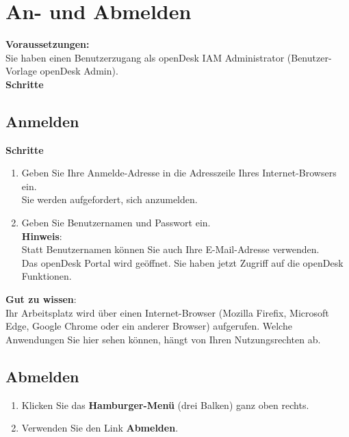 \documentclass[
  letterpaper,
  DIV=11,
  numbers=noendperiod]{scrreprt}
\providecommand{\tightlist}{%
  \setlength{\itemsep}{0pt}\setlength{\parskip}{0pt}}\usepackage{longtable,booktabs,array}
\begin{document}
\section{An- und Abmelden}\label{an--und-abmelden}

\textbf{Voraussetzungen:}\\
Sie haben einen Benutzerzugang als openDesk IAM Administrator
(Benutzer-Vorlage openDesk Admin).\\
\textbf{Schritte}

\subsection{Anmelden}\label{anmelden}

\textbf{Schritte}

\begin{enumerate}
\def\labelenumi{\arabic{enumi}.}
\tightlist
\item
  Geben Sie Ihre Anmelde-Adresse in die Adresszeile Ihres
  Internet-Browsers ein.\\
  Sie werden aufgefordert, sich anzumelden.
\item
  Geben Sie Benutzernamen und Passwort ein.\\
  \textbf{Hinweis}:\\
  Statt Benutzernamen können Sie auch Ihre E-Mail-Adresse verwenden.\\
  Das openDesk Portal wird geöffnet. Sie haben jetzt Zugriff auf die
  openDesk Funktionen.
\end{enumerate}

\textbf{Gut zu wissen}:\\
Ihr Arbeitsplatz wird über einen Internet-Browser (Mozilla Firefix,
Microsoft Edge, Google Chrome oder ein anderer Browser) aufgerufen.
Welche Anwendungen Sie hier sehen können, hängt von Ihren
Nutzungsrechten ab.

\subsection{Abmelden}\label{abmelden-1}

\begin{enumerate}
\def\labelenumi{\arabic{enumi}.}
\tightlist
\item
  Klicken Sie das \textbf{Hamburger-Menü} (drei Balken) ganz oben
  rechts.
\item
  Verwenden Sie den Link \textbf{Abmelden}.
\end{enumerate}
\end{document}
